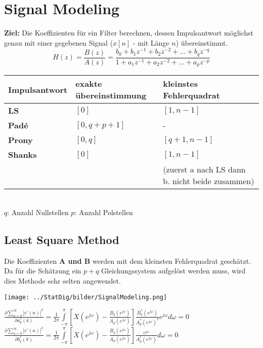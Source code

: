 \vspace{1em}
\begin{minipage}[t]{10cm}
  \vspace{-2cm}
  \section{Signal Modeling }
  \textbf{Ziel: } Die Koeffizienten für ein Filter berechnen, dessen
  Impulsantwort möglichst genau mit einer gegebenen Signal ($x[n]$ - mit
  Länge $n$) übereinstimmt.
      $$ H(z) = \dfrac{B(z)}{A(z)} = \dfrac{b_0 + b_1z^{-1} + b_2 z^{-2} + \dots +
      b_q z^{-q}}{1 + a_1z^{-1} + a_2 z^{-2} + \dots + a_p z^{-p}} $$ 

\end{minipage}
\hspace{0.25cm}
\begin{minipage}{9cm}
	\begin{tabular}{| p{1.4cm} | p{2cm} | p{3.9cm} | }
	    \hline
	    \textbf{Impuls\-antwort}
	    & exakte über\-ein\-stimmung
	    & kleinstes Fehler\-quadrat \\
	    \hline
	    \hline
	    \textbf{LS} 
	    & $[0]$
	    & $[1, n - 1]$\\
	    \hline
	    \textbf{Padé} 
	    & $[0, q + p + 1]$
	    & -\\
	    \hline
	    \textbf{Prony} 
	    & $[0, q]$
	    & $[q + 1, n-1]$ \\
	    \hline
	    \textbf{Shanks} 
	    & $[0]$
	    & $[1, n - 1]$\\
	    &&(zuerst a nach LS dann b. nicht beide zusammen)\\
	    \hline
	\end{tabular}\\
	$q$: Anzahl Nullstellen \hspace{1cm} $p$: Anzahl Polstellen
\end{minipage}

\subsection{Least Square Method }
Die Koeffizienten \textbf{A und B} werden mit dem kleinsten Fehlerquadrat geschätzt. Da für die Schätzung ein $p+q$ Gleichungssystem aufgelöst 
werden muss, wird dies Methode sehr selten angewendet.\\
\begin{minipage}{8cm}
	\texttt{[image: ../StatDig/bilder/SignalModeling.png]}
\end{minipage}
\begin{minipage}{10cm}
$\frac{\partial \sum\limits_{n=0}^{\infty}|e'(n)|^2}{\partial a_p^*(k)}=\frac{1}{2\pi} \int\limits_{-\pi}^{\pi}\left[X(e^{j\omega})-
\frac{B_q(e^{j\omega})}{A_p (e^{j\omega})}\right]\frac{B^*_q(e^{j\omega})}{A_p^* (e^{j\omega})^2}e^{j\omega} d\omega=0$\\
$\frac{\partial \sum\limits_{n=0}^{\infty}|e'(n)|^2}{\partial b_q^*(k)}=\frac{1}{2\pi} \int\limits_{-\pi}^{\pi}\left[X(e^{j\omega})-
\frac{B_q(e^{j\omega})}{A_p (e^{j\omega})}\right]\frac{e^{j\omega}}{A_p^* (e^{j\omega})} d\omega=0$\\
\end{minipage} 
